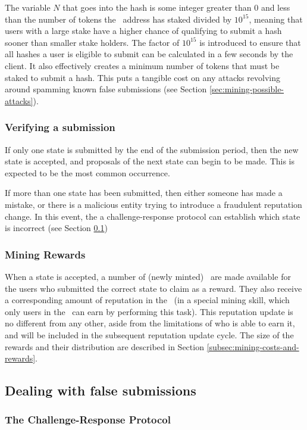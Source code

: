 The variable $N$ that goes into the hash is some integer greater than 0 and less than the number of tokens the \rcth\ address has staked divided by $10^{15}$, meaning that users with a large stake have a higher chance of qualifying to submit a hash sooner than smaller stake holders. The factor of $10^{15}$ is introduced to ensure that all hashes a user is eligible to submit can be calculated in a few seconds by the client. It also effectively creates a minimum number of tokens that must be staked to submit a hash. This puts a tangible cost on any attacks revolving around spamming known false submissions (see Section \ref{sec:mining-possible-attacks}). 
%
\subsubsection*{Verifying a submission}
If only one state is submitted by the end of the submission period, then the new state is accepted, and proposals of the next state can begin to be made. This is expected to be the most common occurrence.

If more than one state has been submitted, then either someone has made a mistake, or there is a malicious entity trying to introduce a fraudulent reputation change. In this event, the a challenge-response protocol can establish which state is incorrect (see Section \ref{sec:challengeresponse})

\subsubsection*{Mining Rewards}

When a state is accepted, a number of (newly minted) \rcts\ are made available for the users who submitted the correct state to claim as a reward. They also receive a corresponding amount of reputation in the \rc\ (in a special mining skill, which only users in the \rc\ can earn by performing this task). This reputation update is no different from any other, aside from the limitations of who is able to earn it, and will be included in the subsequent reputation update cycle. The size of the rewards and their distribution are described in Section \ref{subsec:mining-costs-and-rewards}.

\subsection{Dealing with false submissions}\label{sec:challengeresponse}
%
\subsubsection{The Challenge-Response Protocol}

